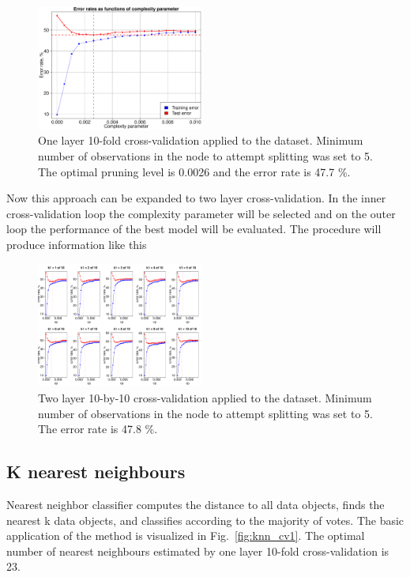 \documentclass[10pt, paper=a4]{article}
\begin{document}
\begin{figure}[htbp]
  \centering
  \includegraphics[width = 0.49\textwidth]{decision_tree_err_CV1.pdf}
  \caption{One layer 10-fold cross-validation applied to the
    dataset. Minimum number of observations in the node to attempt
    splitting was set to 5.  The optimal pruning level is 0.0026 and
    the error rate is 47.7 \%.}
  \label{fig:cv_1}
\end{figure}

Now this approach can be expanded to two layer cross-validation. In
the inner cross-validation loop the complexity parameter will be
selected and on the outer loop the performance of the best model will
be evaluated.  The procedure will produce information like this

\begin{figure}[htbp]
  \centering
  \includegraphics[width = 0.49\textwidth]{decision_tree_err_CV2.pdf}
  \caption{Two layer 10-by-10 cross-validation applied to the
    dataset. Minimum number of observations in the node to attempt
    splitting was set to 5.  The error rate is 47.8 \%.}
  \label{fig:cv_2}
\end{figure}

\subsection{K nearest neighbours}

Nearest neighbor classifier computes the distance to all data objects,
finds the nearest k data objects, and classifies according to the
majority of votes.  The basic application of the method is visualized
in Fig.~\ref{fig:knn_cv1}.  The optimal number of nearest neighbours
estimated by one layer 10-fold cross-validation is 23.
\end{document}
